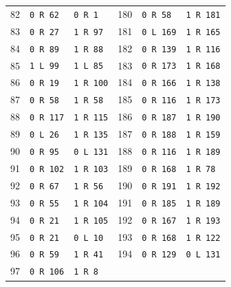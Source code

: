 \begin{longtable}{rll@{\qquad}rll}
82 & \texttt{0 R 62} & \texttt{0 R 1} & 180 & \texttt{0 R 58} & \texttt{1 R 181}\\
83 & \texttt{0 R 27} & \texttt{1 R 97} & 181 & \texttt{0 L 169} & \texttt{1 R 165}\\
84 & \texttt{0 R 89} & \texttt{1 R 88} & 182 & \texttt{0 R 139} & \texttt{1 R 116}\\
85 & \texttt{1 L 99} & \texttt{1 L 85} & 183 & \texttt{0 R 173} & \texttt{1 R 168}\\
86 & \texttt{0 R 19} & \texttt{1 R 100} & 184 & \texttt{0 R 166} & \texttt{1 R 138}\\
87 & \texttt{0 R 58} & \texttt{1 R 58} & 185 & \texttt{0 R 116} & \texttt{1 R 173}\\
88 & \texttt{0 R 117} & \texttt{1 R 115} & 186 & \texttt{0 R 187} & \texttt{1 R 190}\\
89 & \texttt{0 L 26} & \texttt{1 R 135} & 187 & \texttt{0 R 188} & \texttt{1 R 159}\\
90 & \texttt{0 R 95} & \texttt{0 L 131} & 188 & \texttt{0 R 116} & \texttt{1 R 189}\\
91 & \texttt{0 R 102} & \texttt{1 R 103} & 189 & \texttt{0 R 168} & \texttt{1 R 78}\\
92 & \texttt{0 R 67} & \texttt{1 R 56} & 190 & \texttt{0 R 191} & \texttt{1 R 192}\\
93 & \texttt{0 R 55} & \texttt{1 R 104} & 191 & \texttt{0 R 185} & \texttt{1 R 189}\\
94 & \texttt{0 R 21} & \texttt{1 R 105} & 192 & \texttt{0 R 167} & \texttt{1 R 193}\\
95 & \texttt{0 R 21} & \texttt{0 L 10} & 193 & \texttt{0 R 168} & \texttt{1 R 122}\\
96 & \texttt{0 R 59} & \texttt{1 R 41} & 194 & \texttt{0 R 129} & \texttt{0 L 131}\\
97 & \texttt{0 R 106} & \texttt{1 R 8} &  & & \\
\end{longtable}
\normalsize
